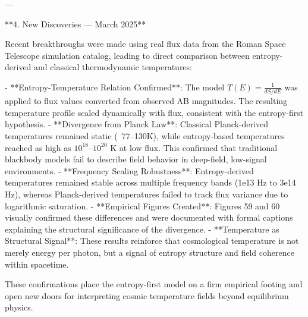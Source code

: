 ---

**4. New Discoveries — March 2025**

Recent breakthroughs were made using real flux data from the Roman Space Telescope simulation catalog, leading to direct comparison between entropy-derived and classical thermodynamic temperatures:

- **Entropy-Temperature Relation Confirmed**: The model \( T(E) = \frac{1}{dS/dE} \) was applied to flux values converted from observed AB magnitudes. The resulting temperature profile scaled dynamically with flux, consistent with the entropy-first hypothesis.
- **Divergence from Planck Law**: Classical Planck-derived temperatures remained static (~77–130K), while entropy-based temperatures reached as high as \(10^{18}\)–\(10^{20}\) K at low flux. This confirmed that traditional blackbody models fail to describe field behavior in deep-field, low-signal environments.
- **Frequency Scaling Robustness**: Entropy-derived temperatures remained stable across multiple frequency bands (1e13 Hz to 3e14 Hz), whereas Planck-derived temperatures failed to track flux variance due to logarithmic saturation.
- **Empirical Figures Created**: Figures 59 and 60 visually confirmed these differences and were documented with formal captions explaining the structural significance of the divergence.
- **Temperature as Structural Signal**: These results reinforce that cosmological temperature is not merely energy per photon, but a signal of entropy structure and field coherence within spacetime.

These confirmations place the entropy-first model on a firm empirical footing and open new doors for interpreting cosmic temperature fields beyond equilibrium physics.

